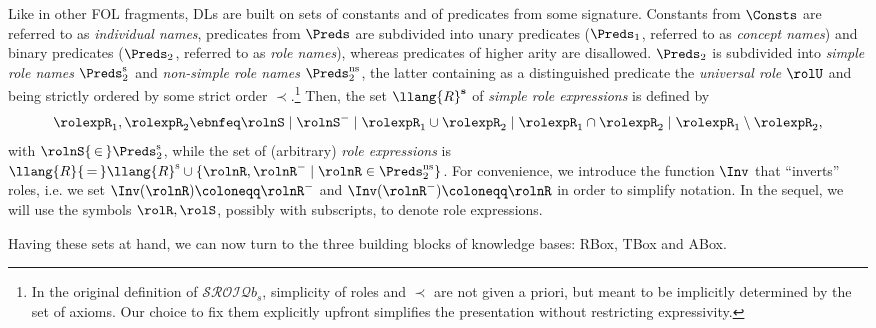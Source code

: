 Like in other FOL fragments, DLs are built on sets of constants and of predicates from some signature. Constants from $\Consts$ are referred to as \emph{individual names}, predicates from $\Preds$ are subdivided into unary predicates ($\Preds_1$, referred to as \emph{concept names}) and binary predicates ($\Preds_2$, referred to as \emph{role names}), whereas predicates of higher arity are disallowed. $\Preds_2$ is subdivided into \emph{simple role names} $\Preds^\mathrm{s}_2$ and \emph{non-simple role names} $\Preds^\mathrm{ns}_2$, the latter containing as a distinguished predicate the \emph{universal role} $\rolU$ and being strictly ordered by some strict order $\prec$.\footnote{In the original definition of $\mathcal{SROIQ}b_s$, simplicity of roles and $\prec$ are not given a priori, but meant to be implicitly determined by the set of axioms. Our choice to fix them explicitly upfront simplifies the presentation without restricting expressivity.}
Then, the set $ \llang{R}^\mathbf{s}$ of \emph{simple role expressions} is defined by
$$
\rolexpR_1,\rolexpR_2 \ebnfeq \rolnS \mid \rolnS^- \mid \rolexpR_1\cup\rolexpR_2 \mid \rolexpR_1\cap\rolexpR_2 \mid \rolexpR_1\setminus\rolexpR_2,
$$%
with $\rolnS {\,\in\,} \Preds^\mathrm{s}_2$, while the set of (arbitrary) \emph{role expressions} is $ \llang{R} {\,=\,}  \llang{R}^\mathrm{s} \cup \{\rolnR, \rolnR^- \mid \rolnR \in \Preds^\mathrm{ns}_2\}$. 
For convenience, we introduce the function $\Inv$ that ``inverts'' roles, i.e. we set $\Inv(\rolnR)\coloneqq\rolnR^-$ and $\Inv(\rolnR^-) \coloneqq \rolnR$ in order to simplify notation. In the sequel, we will use the symbols $\rolR, \rolS$, possibly with subscripts, to denote role expressions.

Having these sets at hand, we can now turn to the three building blocks of \SROIQ{} knowledge bases: RBox, TBox and ABox.

